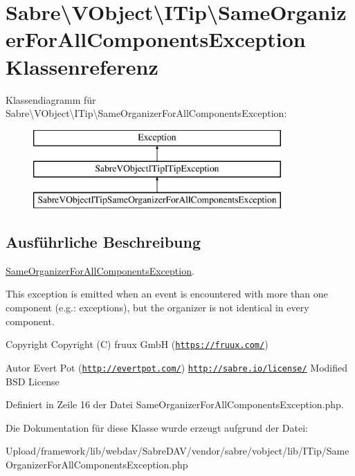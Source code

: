 \hypertarget{class_sabre_1_1_v_object_1_1_i_tip_1_1_same_organizer_for_all_components_exception}{}\section{Sabre\textbackslash{}V\+Object\textbackslash{}I\+Tip\textbackslash{}Same\+Organizer\+For\+All\+Components\+Exception Klassenreferenz}
\label{class_sabre_1_1_v_object_1_1_i_tip_1_1_same_organizer_for_all_components_exception}
Klassendiagramm für Sabre\textbackslash{}V\+Object\textbackslash{}I\+Tip\textbackslash{}Same\+Organizer\+For\+All\+Components\+Exception\+:\begin{figure}[H]
\begin{center}
\leavevmode
\includegraphics[height=3.000000cm]{class_sabre_1_1_v_object_1_1_i_tip_1_1_same_organizer_for_all_components_exception}
\end{center}
\end{figure}


\subsection{Ausführliche Beschreibung}
\mbox{\hyperlink{class_sabre_1_1_v_object_1_1_i_tip_1_1_same_organizer_for_all_components_exception}{Same\+Organizer\+For\+All\+Components\+Exception}}.

This exception is emitted when an event is encountered with more than one component (e.\+g.\+: exceptions), but the organizer is not identical in every component.

\begin{DoxyCopyright}{Copyright}
Copyright (C) fruux GmbH (\href{https://fruux.com/}{\tt https\+://fruux.\+com/}) 
\end{DoxyCopyright}
\begin{DoxyAuthor}{Autor}
Evert Pot (\href{http://evertpot.com/}{\tt http\+://evertpot.\+com/})  \href{http://sabre.io/license/}{\tt http\+://sabre.\+io/license/} Modified B\+SD License 
\end{DoxyAuthor}


Definiert in Zeile 16 der Datei Same\+Organizer\+For\+All\+Components\+Exception.\+php.



Die Dokumentation für diese Klasse wurde erzeugt aufgrund der Datei\+:\begin{DoxyCompactItemize}
\item 
Upload/framework/lib/webdav/\+Sabre\+D\+A\+V/vendor/sabre/vobject/lib/\+I\+Tip/Same\+Organizer\+For\+All\+Components\+Exception.\+php\end{DoxyCompactItemize}
